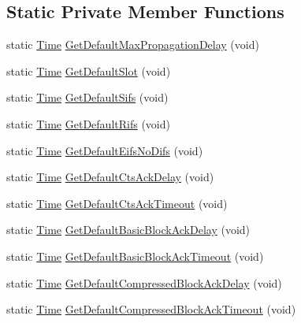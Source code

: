 \subsection*{Static Private Member Functions}
\begin{DoxyCompactItemize}
\item 
static \hyperlink{classns3_1_1Time}{Time} \hyperlink{classns3_1_1WifiMac_a532b1611ce6a3ece041e4d2d9d582876}{Get\+Default\+Max\+Propagation\+Delay} (void)
\item 
static \hyperlink{classns3_1_1Time}{Time} \hyperlink{classns3_1_1WifiMac_a438f3cb81c53237607d9ef7e98bcf506}{Get\+Default\+Slot} (void)
\item 
static \hyperlink{classns3_1_1Time}{Time} \hyperlink{classns3_1_1WifiMac_a170c02fa6edf8d94ef16f821936635c2}{Get\+Default\+Sifs} (void)
\item 
static \hyperlink{classns3_1_1Time}{Time} \hyperlink{classns3_1_1WifiMac_aff9e93c259224db0d0f881a1f944fb89}{Get\+Default\+Rifs} (void)
\item 
static \hyperlink{classns3_1_1Time}{Time} \hyperlink{classns3_1_1WifiMac_af7697f22798f5fc8136c0ff93d73784a}{Get\+Default\+Eifs\+No\+Difs} (void)
\item 
static \hyperlink{classns3_1_1Time}{Time} \hyperlink{classns3_1_1WifiMac_adc9316472b38d2a7c48ed0b5c0236508}{Get\+Default\+Cts\+Ack\+Delay} (void)
\item 
static \hyperlink{classns3_1_1Time}{Time} \hyperlink{classns3_1_1WifiMac_a4134e0fdfcdff8767412bb4abd63bdda}{Get\+Default\+Cts\+Ack\+Timeout} (void)
\item 
static \hyperlink{classns3_1_1Time}{Time} \hyperlink{classns3_1_1WifiMac_a8c100403c8a8dbb5757ba0b0a837f62e}{Get\+Default\+Basic\+Block\+Ack\+Delay} (void)
\item 
static \hyperlink{classns3_1_1Time}{Time} \hyperlink{classns3_1_1WifiMac_ad2ad0806bee4cb0c4ced1fd541a8032e}{Get\+Default\+Basic\+Block\+Ack\+Timeout} (void)
\item 
static \hyperlink{classns3_1_1Time}{Time} \hyperlink{classns3_1_1WifiMac_ab9fd98db7f41200b9813fbd9d819a66d}{Get\+Default\+Compressed\+Block\+Ack\+Delay} (void)
\item 
static \hyperlink{classns3_1_1Time}{Time} \hyperlink{classns3_1_1WifiMac_ade1ea0a5c8c41dbb2e8678696e8ec1ae}{Get\+Default\+Compressed\+Block\+Ack\+Timeout} (void)
\end{DoxyCompactItemize}
